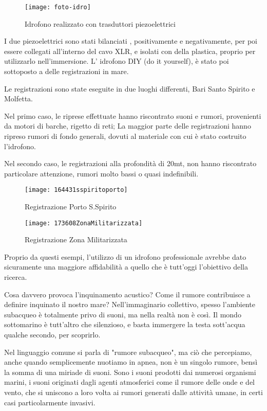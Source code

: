 \begin{figure}[h]
\centering
\texttt{[image: foto-idro]}
\caption{Idrofono realizzato con trasduttori piezoelettrici}
\end{figure}

I due piezoelettrici sono stati bilanciati , positivamente e negativamente, per poi essere collegati all'interno del cavo XLR, e isolati con della plastica, proprio per utilizzarlo nell'immersione. 
L' idrofono DIY (do it yourself), è stato poi sottoposto a delle registrazioni in mare. 

Le registrazioni sono state eseguite in due luoghi differenti, Bari Santo Spirito e Molfetta. %

Nel primo caso, le riprese effettuate hanno riscontrato suoni e rumori, provenienti da motori di barche, rigetto di reti; 
La maggior parte delle registrazioni hanno ripreso rumori di fondo generali, dovuti al materiale con cui è stato costruito l'idrofono.

Nel secondo caso, le registrazioni alla profondità di 20mt, non hanno riscontrato particolare attenzione, rumori molto bassi o quasi indefinibili. 

\begin{figure}[h]
\centering
\texttt{[image: 164431sspiritoporto]}
\caption{Registrazione Porto S.Spirito}
\label{recsspirito}
\end{figure}

\begin{figure}[h]
\centering
\texttt{[image: 173608ZonaMilitarizzata]}
\caption{Registrazione Zona Militarizzata}
\label{recmilitari}
\end{figure}

Proprio da questi esempi, l'utilizzo di un idrofono professionale avrebbe dato sicuramente una maggiore affidabilità a quello che è tutt'oggi l'obiettivo della ricerca. 

Cosa davvero provoca l'inquinamento acustico? Come il rumore contribuisce a definire inquinato il nostro mare?
Nell'immaginario collettivo, spesso l'ambiente subacqueo è totalmente privo di suoni, ma nella realtà non è così. 
Il mondo sottomarino è tutt'altro che silenzioso, e basta immergere la testa sott'acqua qualche secondo, per scoprirlo.

Nel linguaggio comune si parla di "rumore subacqueo", ma ciò che percepiamo, anche quando semplicemente nuotiamo in apnea, non è un singolo rumore, bensì la somma di una miriade di suoni. 
Sono i suoni prodotti dai numerosi organismi marini, i suoni originati dagli agenti atmosferici come il rumore delle onde e del vento, che si uniscono a loro volta ai rumori generati dalle attività umane, in certi casi particolarmente invasivi.

